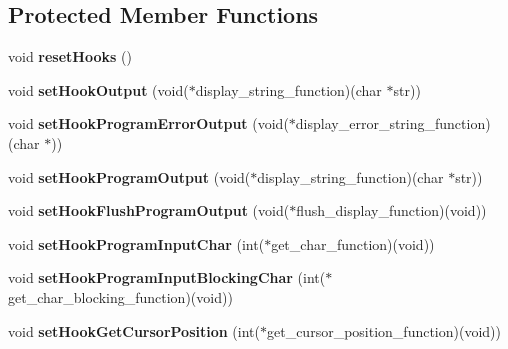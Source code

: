 \subsection*{Protected Member Functions}
\begin{DoxyCompactItemize}
\item 
\hypertarget{class_g_a_u_s_s_a0df033134e600e217a18a1db1e64158c}{void {\bfseries reset\-Hooks} ()}\label{class_g_a_u_s_s_a0df033134e600e217a18a1db1e64158c}

\item 
\hypertarget{class_g_a_u_s_s_a1b95254f8cfd40f1b4b3e098bd606369}{void {\bfseries set\-Hook\-Output} (void($\ast$display\-\_\-string\-\_\-function)(char $\ast$str))}\label{class_g_a_u_s_s_a1b95254f8cfd40f1b4b3e098bd606369}

\item 
\hypertarget{class_g_a_u_s_s_af3ff563e38e98ddb4ea541de7279f44f}{void {\bfseries set\-Hook\-Program\-Error\-Output} (void($\ast$display\-\_\-error\-\_\-string\-\_\-function)(char $\ast$))}\label{class_g_a_u_s_s_af3ff563e38e98ddb4ea541de7279f44f}

\item 
\hypertarget{class_g_a_u_s_s_aa9782a669facb214976b23b0657e4fef}{void {\bfseries set\-Hook\-Program\-Output} (void($\ast$display\-\_\-string\-\_\-function)(char $\ast$str))}\label{class_g_a_u_s_s_aa9782a669facb214976b23b0657e4fef}

\item 
\hypertarget{class_g_a_u_s_s_a49a63932fa65fe93e15065dcfca89b8a}{void {\bfseries set\-Hook\-Flush\-Program\-Output} (void($\ast$flush\-\_\-display\-\_\-function)(void))}\label{class_g_a_u_s_s_a49a63932fa65fe93e15065dcfca89b8a}

\item 
\hypertarget{class_g_a_u_s_s_a775d891a6cd5cd84f342db216b46826c}{void {\bfseries set\-Hook\-Program\-Input\-Char} (int($\ast$get\-\_\-char\-\_\-function)(void))}\label{class_g_a_u_s_s_a775d891a6cd5cd84f342db216b46826c}

\item 
\hypertarget{class_g_a_u_s_s_ab85b990c0e16e85e9045f40a73b641cb}{void {\bfseries set\-Hook\-Program\-Input\-Blocking\-Char} (int($\ast$get\-\_\-char\-\_\-blocking\-\_\-function)(void))}\label{class_g_a_u_s_s_ab85b990c0e16e85e9045f40a73b641cb}

\item 
\hypertarget{class_g_a_u_s_s_a492a18c9aa67bd11f145a40be85609a6}{void {\bfseries set\-Hook\-Get\-Cursor\-Position} (int($\ast$get\-\_\-cursor\-\_\-position\-\_\-function)(void))}\label{class_g_a_u_s_s_a492a18c9aa67bd11f145a40be85609a6}


\end{DoxyCompactItemize}
